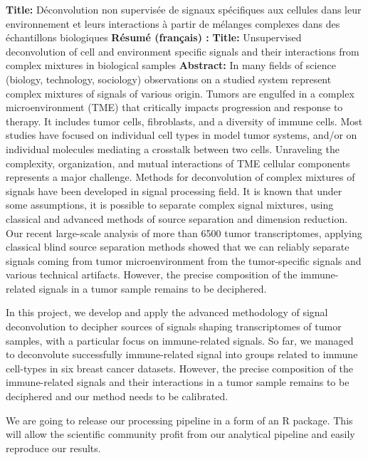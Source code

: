 \documentclass[12pt,]{book}
\theoremstyle{definition}
\theoremstyle{definition}
\theoremstyle{definition}
\theoremstyle{remark}
\begin{document}
\begin{titlepage}
\clearpage


\newpage
\thispagestyle{empty}
\noindent %

\textbf{Title: }
Déconvolution non supervisée de signaux spécifiques aux cellules dans leur environnement et leurs interactions à partir de mélanges complexes dans des échantillons biologiques
\vskip 1cm
\textbf{Résumé (français) :}
\vskip 1cm
\noindent
\textbf{Title: }
Unsupervised deconvolution of cell and environment specific signals and their interactions from complex mixtures in biological samples
\vskip 1cm
\noindent
\textbf{Abstract:}
In many fields of science (biology, technology, sociology) observations on a studied system represent complex mixtures of signals of various origin. Tumors are engulfed in a complex microenvironment (TME) that critically impacts progression and response to therapy. It includes tumor cells, fibroblasts, and a diversity of immune cells. Most studies have focused on individual cell types in model tumor systems, and/or on individual molecules mediating a crosstalk between two cells. Unraveling the complexity, organization, and mutual interactions of TME cellular components represents a major challenge.
Methods for deconvolution of complex mixtures of signals have been developed in signal processing field. It is known that under some assumptions, it is possible to separate complex signal mixtures, using classical and advanced methods of source separation and dimension reduction. Our recent large-scale analysis of more than 6500 tumor transcriptomes, applying classical blind source separation methods showed that we can reliably separate signals coming from tumor microenvironment from the tumor-specific signals and various technical artifacts. However, the precise composition of the immune-related signals in a tumor sample remains to be deciphered.

In this project, we develop and apply the advanced methodology of signal deconvolution to decipher sources of signals shaping transcriptomes of tumor samples, with a particular focus on immune-related signals. So far, we managed to deconvolute successfully immune-related signal into groups related to immune cell-types in six breast cancer datasets. However, the precise composition of the immune-related signals and their interactions in a tumor sample remains to be deciphered and our method needs to be calibrated.

We are going to release our processing pipeline in a form of an R package. This will allow the scientific community profit from our analytical pipeline and easily reproduce our results.


\end{titlepage}
\end{document}
